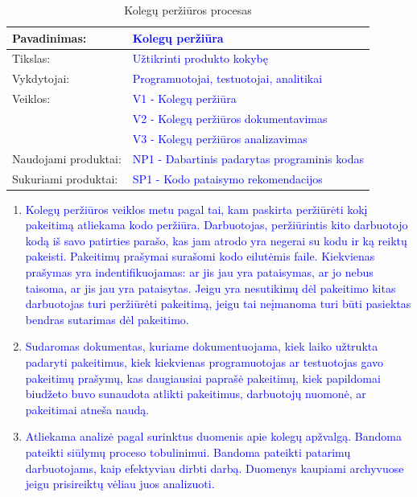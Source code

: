 \documentclass{VUMIFPSkursinis}
\begin{document}
	\begin{center}
		\begin{table}[ht]
			\caption{Kolegų peržiūros procesas}
			\begin{tabular}{ | l | l | }
				\hline
				Pavadinimas:         & \textcolor{blue}{Kolegų peržiūra}				\\ \hline
				Tikslas:             & \textcolor{blue}{Užtikrinti produkto kokybę}			\\ \hline
				Vykdytojai:          & \textcolor{blue}{Programuotojai, testuotojai, analitikai}			\\ \hline
				Veiklos:             & \textcolor{blue}{V1 - Kolegų peržiūra}	\\
							& \textcolor{blue}{V2 - Kolegų peržiūros dokumentavimas}	\\ 
							& \textcolor{blue}{V3 - Kolegų peržiūros analizavimas} \\ \hline
				Naudojami produktai: & \textcolor{blue}{NP1 - Dabartinis padarytas programinis kodas}	\\ \hline
				Sukuriami produktai: & \textcolor{blue}{SP1 - Kodo pataisymo rekomendacijos}	\\ \hline
			\end{tabular}
		\end{table}
	\end{center}
		\begin{enumerate}
			\item{\textcolor{blue}{Kolegų peržiūros veiklos metu pagal tai, kam paskirta peržiūrėti kokį pakeitimą atliekama kodo peržiūra. 
				Darbuotojas, peržiūrintis kito darbuotojo kodą iš savo patirties parašo, kas jam atrodo yra negerai su kodu ir ką reiktų pakeisti.
				Pakeitimų prašymai surašomi kodo eilutėmis faile.
				Kiekvienas prašymas yra indentifikuojamas: ar jis jau yra pataisymas, ar jo nebus taisoma, ar jis jau yra pataisytas.
				Jeigu yra nesutikimų dėl pakeitimo kitas darbuotojas turi peržiūrėti pakeitimą, jeigu tai neįmanoma turi būti pasiektas bendras sutarimas dėl pakeitimo.}}
			\item{\textcolor{blue}{Sudaromas dokumentas, kuriame dokumentuojama, kiek laiko užtrukta padaryti pakeitimus, kiek kiekvienas programuotojas ar testuotojas gavo pakeitimų prašymų, kas daugiausiai paprašė pakeitimų, kiek papildomai biudžeto buvo sunaudota atlikti pakeitimus, darbuotojų nuomonė, ar pakeitimai atneša naudą.}}
			\item{\textcolor{blue}{Atliekama analizė pagal surinktus duomenis apie kolegų apžvalgą.
				Bandoma pateikti siūlymų proceso tobulinimui.
				Bandoma pateikti patarimų darbuotojams, kaip efektyviau dirbti darbą.
				Duomenys kaupiami archyvuose jeigu prisireiktų vėliau juos analizuoti.}}
		\end{enumerate}
		
\end{document}
